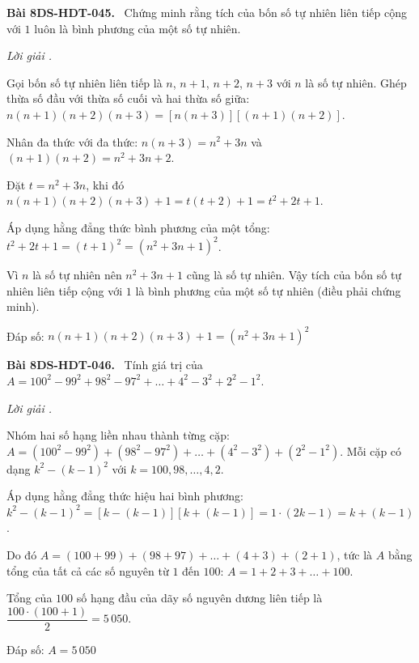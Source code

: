 \documentclass[12pt,a4paper]{article}
\newenvironment{problem}[1][]{\par\medskip\noindent\textbf{Bài #1.}\ }{\par}
\newenvironment{solution}[1][]{\par\noindent\textit{Lời giải #1.}\par}{\par}
\begin{document}
\begin{problem}[8DS-HDT-045]
Chứng minh rằng tích của bốn số tự nhiên liên tiếp cộng với $1$ luôn là bình phương của một số tự nhiên.

\begin{solution}
Gọi bốn số tự nhiên liên tiếp là $n$, $n + 1$, $n + 2$, $n + 3$ với $n$ là số tự nhiên. Ghép thừa số đầu với thừa số cuối và hai thừa số giữa: $n(n + 1)(n + 2)(n + 3) = \left[n(n + 3)\right]\left[(n + 1)(n + 2)\right]$.

Nhân đa thức với đa thức: $n(n + 3) = n^2 + 3n$ và $(n + 1)(n + 2) = n^2 + 3n + 2$.

Đặt $t = n^2 + 3n$, khi đó $n(n + 1)(n + 2)(n + 3) + 1 = t(t + 2) + 1 = t^2 + 2t + 1$.

Áp dụng hằng đẳng thức bình phương của một tổng: $t^2 + 2t + 1 = (t + 1)^2 = (n^2 + 3n + 1)^2$.

Vì $n$ là số tự nhiên nên $n^2 + 3n + 1$ cũng là số tự nhiên. Vậy tích của bốn số tự nhiên liên tiếp cộng với $1$ là bình phương của một số tự nhiên (điều phải chứng minh).

Đáp số: $\boxed{n(n + 1)(n + 2)(n + 3) + 1 = (n^2 + 3n + 1)^2}$
\end{solution}
\end{problem}

\begin{problem}[8DS-HDT-046]
Tính giá trị của $A = 100^2 - 99^2 + 98^2 - 97^2 + \dots + 4^2 - 3^2 + 2^2 - 1^2$.

\begin{solution}
Nhóm hai số hạng liền nhau thành từng cặp: $A = (100^2 - 99^2) + (98^2 - 97^2) + \dots + (4^2 - 3^2) + (2^2 - 1^2)$. Mỗi cặp có dạng $k^2 - (k - 1)^2$ với $k = 100, 98, \dots, 4, 2$.

Áp dụng hằng đẳng thức hiệu hai bình phương: $k^2 - (k - 1)^2 = \left[k - (k - 1)\right]\left[k + (k - 1)\right] = 1 \cdot (2k - 1) = k + (k - 1)$.

Do đó $A = (100 + 99) + (98 + 97) + \dots + (4 + 3) + (2 + 1)$, tức là $A$ bằng tổng của tất cả các số nguyên từ $1$ đến $100$: $A = 1 + 2 + 3 + \dots + 100$.

Tổng của $100$ số hạng đầu của dãy số nguyên dương liên tiếp là $\dfrac{100 \cdot (100 + 1)}{2} = 5\,050$.

Đáp số: $\boxed{A = 5\,050}$
\end{solution}
\end{problem}
\end{document}
